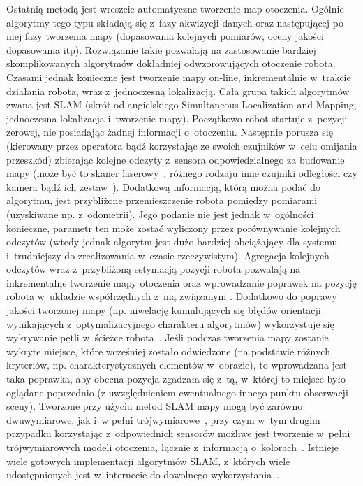 Ostatnią metodą jest wreszcie automatyczne tworzenie map otoczenia. Ogólnie
algorytmy tego typu składają się z~fazy akwizycji danych oraz następującej
po niej fazy tworzenia mapy (dopasowania kolejnych pomiarów, oceny jakości
dopasowania itp). Rozwiązanie takie pozwalają na zastosowanie bardziej skomplikowanych
algorytmów dokładniej odwzorowujących otoczenie robota. Czasami jednak konieczne
jest tworzenie mapy on-line, inkrementalnie w~trakcie działania robota,
wraz z~jednoczesną lokalizacją. Cała grupa takich algorytmów zwana jest SLAM
(skrót od angielskiego Simultaneous Localization and Mapping, jednoczesna
lokalizacja i~tworzenie mapy). Początkowo robot startuje z~pozycji zerowej,
nie posiadając żadnej informacji o~otoczeniu. Następnie porusza się (kierowany przez
operatora bądź korzystając ze swoich czujników w~celu omijania przeszkód) zbierając
kolejne odczyty z~sensora odpowiedzialnego za budowanie mapy (może być to skaner laserowy~\cite{laser_slam},
różnego rodzaju inne czujniki odległości czy kamera bądź ich zestaw~\cite{vslam}). Dodatkową
informacją, którą można podać do algorytmu, jest przybliżone przemieszczenie robota
pomiędzy pomiarami (uzyskiwane np. z~odometrii). Jego podanie nie jest jednak w~ogólności
konieczne, parametr ten może zostać wyliczony przez porównywanie kolejnych odczytów
(wtedy jednak algorytm jest dużo bardziej obciążający dla systemu i~trudniejszy do zrealizowania
w~czasie rzeczywistym). Agregacja kolejnych odczytów wraz z~przybliżoną estymacją
pozycji robota pozwalają na inkrementalne tworzenie mapy otoczenia oraz wprowadzanie
poprawek na pozycję robota w~układzie współrzędnych z~nią związanym \cite{Dissanayake01asolution}.
Dodatkowo do poprawy jakości tworzonej mapy (np. niwelację kumulujących się błędów orientacji
wynikających z~optymalizacyjnego charakteru algorytmów) wykorzystuje się wykrywanie pętli
w~ścieżce robota~\cite{slam-loop}. Jeśli podczas tworzenia mapy zostanie wykryte
miejsce, które wcześniej zostało odwiedzone (na podstawie różnych kryteriów, np. charakterystycznych
elementów w~obrazie), to wprowadzana jest taka poprawka, aby obecna pozycja zgadzała się
z~tą, w~której to miejsce było oglądane poprzednio (z uwzględnieniem ewentualnego
innego punktu obserwacji sceny). Tworzone przy użyciu metod SLAM mapy mogą być zarówno
dwuwymiarowe, jak i~w pełni trójwymiarowe~\cite{6dslam}, przy czym w~tym drugim przypadku
korzystając z~odpowiednich sensorów możliwe jest tworzenie w~pełni trójwymiarowych
modeli otoczenia, łącznie z~informacją o~kolorach~\cite{kinect_slam}.
Istnieje wiele gotowych implementacji algorytmów SLAM, z~których wiele udostępnionych
jest w~internecie do dowolnego wykorzystania~\cite{openslam}.

